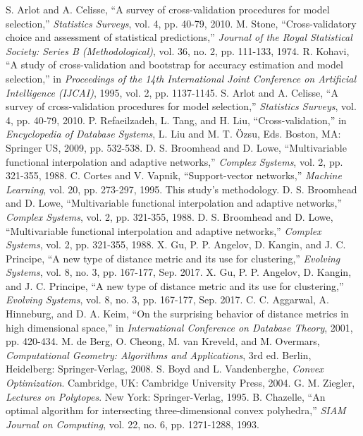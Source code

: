 \documentclass[conference]{IEEEtran}
\begin{document}
\begin{thebibliography}{99}
 S. Arlot and A. Celisse, “A survey of cross-validation procedures for model selection,” \textit{Statistics Surveys}, vol. 4, pp. 40-79, 2010.
 M. Stone, “Cross-validatory choice and assessment of statistical predictions,” \textit{Journal of the Royal Statistical Society: Series B (Methodological)}, vol. 36, no. 2, pp. 111-133, 1974.
 R. Kohavi, “A study of cross-validation and bootstrap for accuracy estimation and model selection,” in \textit{Proceedings of the 14th International Joint Conference on Artificial Intelligence (IJCAI)}, 1995, vol. 2, pp. 1137-1145.
 S. Arlot and A. Celisse, “A survey of cross-validation procedures for model selection,” \textit{Statistics Surveys}, vol. 4, pp. 40-79, 2010.
 P. Refaeilzadeh, L. Tang, and H. Liu, “Cross-validation,” in \textit{Encyclopedia of Database Systems}, L. Liu and M. T. Özsu, Eds. Boston, MA: Springer US, 2009, pp. 532-538.
 D. S. Broomhead and D. Lowe, “Multivariable functional interpolation and adaptive networks,” \textit{Complex Systems}, vol. 2, pp. 321-355, 1988.
 C. Cortes and V. Vapnik, “Support-vector networks,” \textit{Machine Learning}, vol. 20, pp. 273-297, 1995.
 This study's methodology.
 D. S. Broomhead and D. Lowe, “Multivariable functional interpolation and adaptive networks,” \textit{Complex Systems}, vol. 2, pp. 321-355, 1988.
 D. S. Broomhead and D. Lowe, “Multivariable functional interpolation and adaptive networks,” \textit{Complex Systems}, vol. 2, pp. 321-355, 1988.
 X. Gu, P. P. Angelov, D. Kangin, and J. C. Principe, “A new type of distance metric and its use for clustering,” \textit{Evolving Systems}, vol. 8, no. 3, pp. 167-177, Sep. 2017.
 X. Gu, P. P. Angelov, D. Kangin, and J. C. Principe, “A new type of distance metric and its use for clustering,” \textit{Evolving Systems}, vol. 8, no. 3, pp. 167-177, Sep. 2017.
 C. C. Aggarwal, A. Hinneburg, and D. A. Keim, “On the surprising behavior of distance metrics in high dimensional space,” in \textit{International Conference on Database Theory}, 2001, pp. 420-434.
 M. de Berg, O. Cheong, M. van Kreveld, and M. Overmars, \textit{Computational Geometry: Algorithms and Applications}, 3rd ed. Berlin, Heidelberg: Springer-Verlag, 2008.
 S. Boyd and L. Vandenberghe, \textit{Convex Optimization}. Cambridge, UK: Cambridge University Press, 2004.
 G. M. Ziegler, \textit{Lectures on Polytopes}. New York: Springer-Verlag, 1995.
 B. Chazelle, “An optimal algorithm for intersecting three-dimensional convex polyhedra,” \textit{SIAM Journal on Computing}, vol. 22, no. 6, pp. 1271-1288, 1993.

\end{thebibliography}
\end{document}
